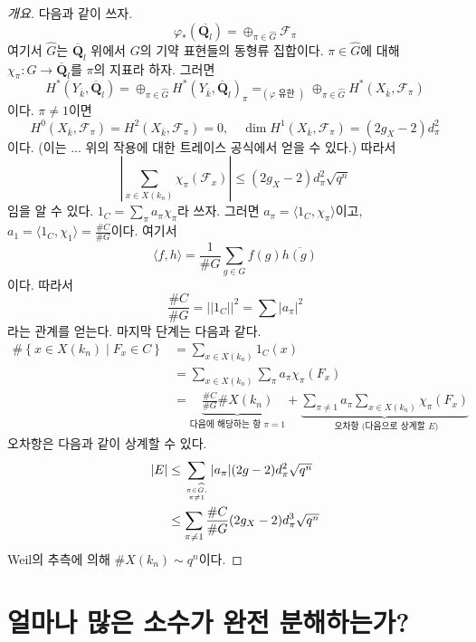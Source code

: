 \begin{proof}[개요]
다음과 같이 쓰자.
$$
\varphi_*(\overline{\mathbf{Q}_l}) =
\oplus_{\pi \in \widehat{G}} \mathcal{F}_{\pi}
$$
여기서 $\widehat{G}$는 $\overline{\mathbf{Q}}_l$ 위에서 $G$의
기약 표현들의 동형류 집합이다. $\pi \in \widehat{G}$에 대해
$\chi_{\pi}: G \to \overline{\mathbf{Q}}_l$를 $\pi$의 지표라 하자.
그러면
$$
H^*(Y_{\overline{k}}, \overline{\mathbf{Q}}_l) =
\oplus_{\pi\in \widehat{G}}
H^*(Y_{\overline{k}}, \overline{\mathbf{Q}}_l)_\pi
=_{(\varphi\text{ 유한 }) }
\oplus_{\pi\in \widehat{G}}
H^*(X_{\overline{k}}, \mathcal{F}_\pi)
$$
이다. $\pi\neq 1$이면
$$
H^0(X_{\overline{k}}, \mathcal{F}_\pi) =
H^2(X_{\overline{k}}, \mathcal{F}_\pi) = 0,\quad
\dim H^1(X_{\overline{k}}, \mathcal{F}_\pi) = (2g_X - 2)d_\pi^2
$$
이다.
(이는 ... 위의 작용에 대한 트레이스 공식에서 얻을 수 있다.) 따라서
$$
|\sum_{x \in X(k_n)} \chi_\pi(\mathcal{F}_x)| \leq
(2g_X - 2) d_\pi^2\sqrt{q^n}
$$
임을 알 수 있다. $1_C = \sum_\pi a_\pi \chi_\pi$라 쓰자. 그러면
$a_\pi = \langle 1_C, \chi_\pi\rangle$이고,
$a_1 = \langle 1_C, \chi_1\rangle = \frac{\# C}{\# G}$이다. 여기서
$$
\langle f, h\rangle = \frac{1}{\# G}\sum_{g \in G} f(g)\overline{h(g)}
$$
이다. 따라서
$$
\frac{\# C}{\# G} = ||1_C||^2 = \sum|a_\pi|^2
$$
라는 관계를 얻는다. 마지막 단계는 다음과 같다.
\begin{align*}
\#\left\{x \in X(k_n) \mid F_x \in C\right\}
& =
\sum_{x \in X(k_n)} 1_C(x) \\
& =
\sum_{x \in X(k_n)} \sum_\pi a_\pi \chi_\pi(F_x) \\
& =
\underbrace{\frac{\# C}{\# G} \# X(k_n)}_{
\text{다음에 해당하는 항 }\pi = 1}
+
\underbrace{\sum_{\pi\neq 1}a_\pi\sum_{x\in X(k_n)}\chi_\pi(F_x)}_{
\text{ 오차항 (다음으로 상계할 }E)}
\end{align*}
오차항은 다음과 같이 상계할 수 있다.
\begin{align*}
|E|
& \leq
\sum_{\pi \in \widehat{G}, \atop \pi \neq 1}
|a_\pi| (2g - 2) d_\pi^2 \sqrt{q^n} \\
& \leq
\sum_{\pi \neq 1} \frac{\# C}{\# G} (2g_X - 2) d_\pi^3 \sqrt{q^n}
\end{align*}
Weil의 추측에 의해 $\# X(k_n)\sim q^n$이다.
\end{proof}



\section{얼마나 많은 소수가 완전 분해하는가?}
\label{section-how-many}

